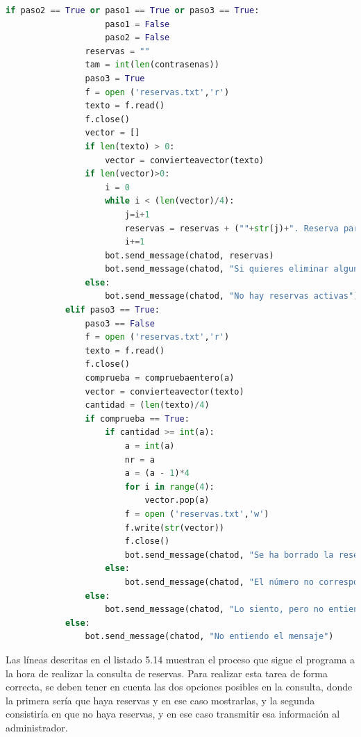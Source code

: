 \begin{lstlisting}[language=Python,
    caption={Consulta y modificación de reservas},
    label=src:consulta-y-modificacion-de-reservas
]
                if paso2 == True or paso1 == True or paso3 == True:
                    paso1 = False
                    paso2 = False 
                reservas = ""
                tam = int(len(contrasenas))
                paso3 = True
                f = open ('reservas.txt','r')
                texto = f.read()
                f.close()
                vector = []
                if len(texto) > 0:
                    vector = convierteavector(texto)
                if len(vector)>0:
                    i = 0
                    while i < (len(vector)/4):
                        j=i+1
                        reservas = reservas + (""+str(j)+". Reserva para el día "+str(vector[i*4+2])+"-"+str(vector[i*4+1])+"-"+str(vector[i*4])+" con número de reserva: "+str(vector[i*4+3])+"\n")
                        i+=1
                    bot.send_message(chatod, reservas)
                    bot.send_message(chatod, "Si quieres eliminar alguna reserva, simplemente escribe el número que deseas eliminar")
                else:
                    bot.send_message(chatod, "No hay reservas activas")
            elif paso3 == True:
                paso3 == False
                f = open ('reservas.txt','r')
                texto = f.read()
                f.close()
                comprueba = compruebaentero(a)
                vector = convierteavector(texto)
                cantidad = (len(texto)/4)
                if comprueba == True:
                    if cantidad >= int(a):
                        a = int(a)
                        nr = a
                        a = (a - 1)*4
                        for i in range(4):
                            vector.pop(a)
                        f = open ('reservas.txt','w')
                        f.write(str(vector))
                        f.close()                                                 
                        bot.send_message(chatod, "Se ha borrado la reserva "+str(nr))
                    else:
                        bot.send_message(chatod, "El número no corresponde a ninguna reserva")
                else:
                    bot.send_message(chatod, "Lo siento, pero no entiendo el mensaje")
            else:
                bot.send_message(chatod, "No entiendo el mensaje")
\end{lstlisting}

Las líneas descritas en el listado 5.14 muestran el proceso que sigue el programa a la hora de realizar la consulta de reservas. Para realizar esta tarea de forma correcta, se deben tener en cuenta las dos opciones posibles en la consulta, donde la primera sería que haya reservas y en ese caso mostrarlas, y la segunda consistiría en que no haya reservas, y en ese caso transmitir esa información al administrador.

